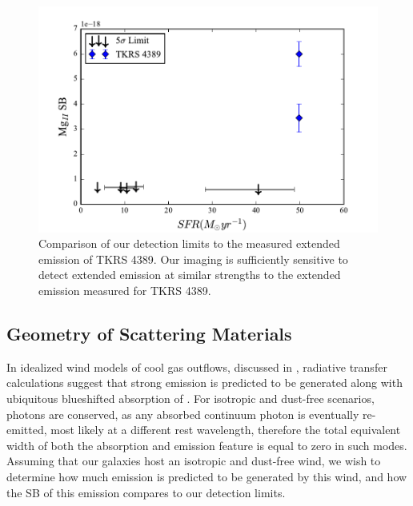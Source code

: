\documentclass[twocolumn]{aastex61}
\begin{document}

\begin{figure}[!htb]
\centering
\includegraphics[scale=0.6]{../Figures/limits.pdf}
\caption{Comparison of our detection limits to the measured extended emission of TKRS 4389. Our imaging is sufficiently sensitive to detect extended emission at similar strengths to the extended emission measured for TKRS 4389.}
\label{fig:detection_lim}
\end{figure}

\subsection{Geometry of Scattering Materials}
In idealized wind models of cool gas outflows, discussed in \cite{Prochaska_2011}, radiative transfer calculations suggest that strong  emission is predicted to be generated along with ubiquitous blueshifted absorption of . For isotropic and dust-free scenarios, photons are conserved, as any absorbed continuum photon is eventually re-emitted, most likely at a different rest wavelength, therefore the total equivalent width of both the absorption and emission feature is equal to zero in such modes. Assuming that our galaxies host an isotropic and dust-free wind, we wish to determine how much emission is predicted to be generated by this wind, and how the SB of this emission compares to our detection limits.
\end{document}
